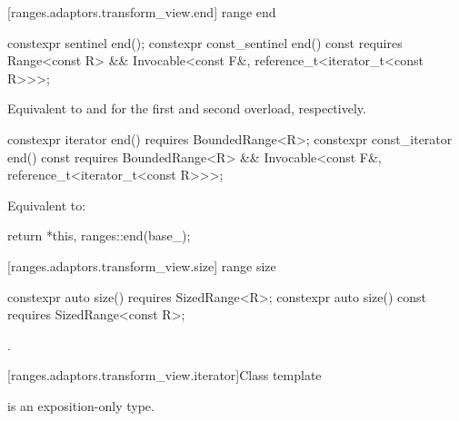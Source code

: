 [ranges.adaptors.transform_view.end]{ range end}

%
\begin{itemdecl}
constexpr sentinel end();
constexpr const_sentinel end() const requires Range<const R> &&
  Invocable<const F&, reference_t<iterator_t<const R>>>;
\end{itemdecl}

\begin{itemdescr}
\pnum
\effects Equivalent to  and
 for the first and second overload,
respectively.
\end{itemdescr}

%
\begin{itemdecl}
constexpr iterator end() requires BoundedRange<R>;
constexpr const_iterator end() const requires BoundedRange<R> &&
  Invocable<const F&, reference_t<iterator_t<const R>>>;
\end{itemdecl}

\begin{itemdescr}
\pnum
\effects Equivalent to:
\begin{codeblock}
return {*this, ranges::end(base_)};
\end{codeblock}
\end{itemdescr}

[ranges.adaptors.transform_view.size]{ range size}

%
\begin{itemdecl}
constexpr auto size() requires SizedRange<R>;
constexpr auto size() const requires SizedRange<const R>;
\end{itemdecl}

\begin{itemdescr}
\pnum
\returns {}.
\end{itemdescr}

[ranges.adaptors.transform_view.iterator]{Class template }

\pnum
{} is an exposition-only type.


